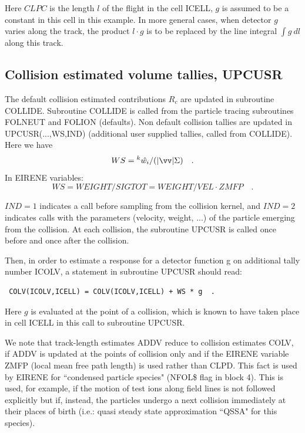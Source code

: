 Here $CLPC$ is the length $l$ of the flight in the cell ICELL, $g$
is assumed to be a constant in this cell in this example. In more
general cases, when detector $g$ varies along the track, the product
$l \cdot g$ is to be replaced by the line integral $\int g~ dl$
along this track.
\subsection{Collision estimated volume tallies, UPCUSR}\label{sec3.2.2}
The default collision estimated contributions $R_c$ are updated in
subroutine COLLIDE. Subroutine COLLIDE is called from the particle
tracing subroutines FOLNEUT and FOLION (defaults). Non default
collision tallies are updated in UPCUSR(...,WS,IND) (additional user
supplied tallies, called from COLLIDE). Here we have
\begin{displaymath}
WS   =  {^k{\hat{w_i}}}
  /   ( | \vv |  \Sigma ) \quad .
\end{displaymath}
In EIRENE variables:
\begin{displaymath}
WS = WEIGHT/SIGTOT = WEIGHT/VEL \cdot ZMFP \quad .
\end{displaymath}

$IND=1$ indicates a call before sampling from the collision
kernel, and $IND=2$ indicates calls with the parameters (velocity,
weight, ...) of the particle emerging from the collision. At each
collision, the subroutine UPCUSR is called once before and once
after the collision.

Then, in order to estimate a response for a detector function g on
additional tally number ICOLV, a statement in subroutine UPCUSR
should read:

\begin{verbatim}
 COLV(ICOLV,ICELL) = COLV(ICOLV,ICELL) + WS * g  .
\end{verbatim}

Here $g$ is evaluated at the point of a collision, which is known
to have taken place in cell ICELL in this call to subroutine
UPCUSR.

We note that track-length estimates ADDV reduce to collision
estimates COLV, if ADDV is updated at the points of collision only
and if the EIRENE variable ZMFP (local mean free path length) is
used rather than CLPD. This fact is used by EIRENE for ``condensed
particle species" (NFOL\$ flag in block 4). This is used, for
example, if the motion of test ions along field lines is not
followed explicitly but if, instead, the particles undergo a next
collision immediately at their places of birth (i.e.: quasi steady
state approximation ``QSSA" for this species).

